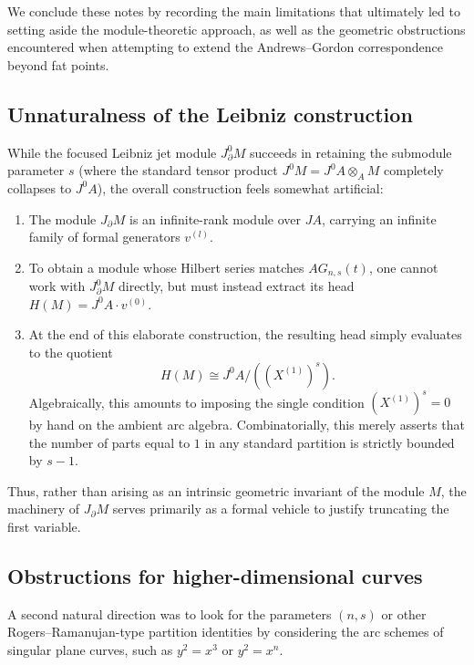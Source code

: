 \documentclass[a4paper, 12pt]{amsart}
\theoremstyle{definition}
\theoremstyle{remark}
\begin{document}
We conclude these notes by recording the main limitations
that ultimately led to setting aside the module-theoretic approach,
as well as the geometric obstructions encountered when attempting to extend
the Andrews--Gordon correspondence beyond fat points.

\subsection{Unnaturalness of the Leibniz construction}
\label{sec:unnaturalness-leibniz}

While the focused Leibniz jet module $J^0_\partial M$ succeeds
in retaining the submodule parameter $s$
(where the standard tensor product $J^0M = J^0A \otimes_A M$ completely collapses to $J^0A$),
the overall construction feels somewhat artificial:
\begin{enumerate}
  \item
  The module $J_\partial M$ is an infinite-rank module over $JA$,
  carrying an infinite family of formal generators $v^{(l)}$.
  \item
  To obtain a module whose Hilbert series matches $AG_{n, s}(t)$,
  one cannot work with $J^0_\partial M$ directly,
  but must instead extract its head $H(M) = J^0A \cdot v^{(0)}$.
  \item
  At the end of this elaborate construction,
  the resulting head simply evaluates to the quotient
  \begin{equation*}
    H(M) \cong J^0A / ((X^{(1)})^s).
  \end{equation*}
  Algebraically, this amounts to imposing the single condition $(X^{(1)})^s = 0$
  by hand on the ambient arc algebra.
  Combinatorially, this merely asserts that the number of parts equal to $1$
  in any standard partition is strictly bounded by $s - 1$.
\end{enumerate}
Thus, rather than arising as an intrinsic geometric invariant of the module $M$,
the machinery of $J_\partial M$ serves primarily as a formal vehicle
to justify truncating the first variable.

\subsection{Obstructions for higher-dimensional curves}
\label{sec:obstructions-curves}

A second natural direction was to look for the parameters $(n, s)$
or other Rogers--Ramanujan-type partition identities
by considering the arc schemes of singular plane curves,
such as $y^2 = x^3$ or $y^2 = x^n$.
\end{document}
